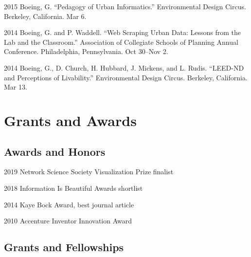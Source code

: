 \documentclass[12pt,letterpaper]{report}
\begin{document}
\begin{tablist}
		\item[2015] \tab Boeing, G. \enquote{Pedagogy of Urban Informatics.} Environmental Design Circus. Berkeley, California. Mar 6.

		\item[2014] \tab Boeing, G. and P. Waddell. \enquote{Web Scraping Urban Data: Lessons from the Lab and the Classroom.} Association of Collegiate Schools of Planning Annual Conference. Philadelphia, Pennsylvania. Oct 30--Nov 2.

		\item[2014] \tab Boeing, G., D. Church, H. Hubbard, J. Mickens, and L. Rudis. \enquote{LEED-ND and Perceptions of Livability.} Environmental Design Circus. Berkeley, California. Mar 13.

	\end{tablist}



	\section*{Grants and Awards}

	\subsection*{Awards and Honors}

	\begin{tablist}

		\item[2019] \tab Network Science Society Visualization Prize finalist

		\item[2018] \tab Information Is Beautiful Awards shortlist

		\item[2014] \tab Kaye Bock Award, best journal article

		\item[2010] \tab Accenture Inventor Innovation Award

	\end{tablist}

	\subsection*{Grants and Fellowships}
\end{document}
